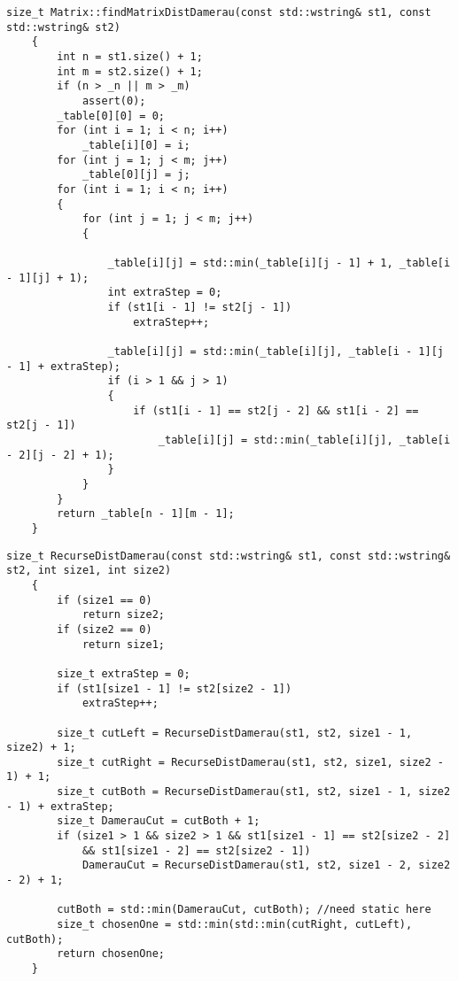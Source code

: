 \begin{lstlisting}[label=lst:damer_matr,caption=Метод нахождения расстояния Дамерау---Левенштейна с использованием матрицы]
    size_t Matrix::findMatrixDistDamerau(const std::wstring& st1, const std::wstring& st2)
    {
        int n = st1.size() + 1;
        int m = st2.size() + 1;
        if (n > _n || m > _m)
            assert(0);
        _table[0][0] = 0;
        for (int i = 1; i < n; i++)
            _table[i][0] = i;
        for (int j = 1; j < m; j++)
            _table[0][j] = j;
        for (int i = 1; i < n; i++)
        {
            for (int j = 1; j < m; j++)
            {
    
                _table[i][j] = std::min(_table[i][j - 1] + 1, _table[i - 1][j] + 1);
                int extraStep = 0;
                if (st1[i - 1] != st2[j - 1])
                    extraStep++;
    
                _table[i][j] = std::min(_table[i][j], _table[i - 1][j - 1] + extraStep);
                if (i > 1 && j > 1)
                {
                    if (st1[i - 1] == st2[j - 2] && st1[i - 2] == st2[j - 1])
                        _table[i][j] = std::min(_table[i][j], _table[i - 2][j - 2] + 1);
                }
            }
        }
        return _table[n - 1][m - 1];
    }
\end{lstlisting}

\begin{lstlisting}[label=lst:damer_rec,caption=Функция нахождения расстояния Дамерау---Левенштейна с использованием рекурсии]
    size_t RecurseDistDamerau(const std::wstring& st1, const std::wstring& st2, int size1, int size2)
    {
        if (size1 == 0)
            return size2;
        if (size2 == 0)
            return size1;
    
        size_t extraStep = 0;
        if (st1[size1 - 1] != st2[size2 - 1])
            extraStep++;
    
        size_t cutLeft = RecurseDistDamerau(st1, st2, size1 - 1, size2) + 1;
        size_t cutRight = RecurseDistDamerau(st1, st2, size1, size2 - 1) + 1;
        size_t cutBoth = RecurseDistDamerau(st1, st2, size1 - 1, size2 - 1) + extraStep;
        size_t DamerauCut = cutBoth + 1;
        if (size1 > 1 && size2 > 1 && st1[size1 - 1] == st2[size2 - 2]
            && st1[size1 - 2] == st2[size2 - 1])
            DamerauCut = RecurseDistDamerau(st1, st2, size1 - 2, size2 - 2) + 1;
    
        cutBoth = std::min(DamerauCut, cutBoth); //need static here
        size_t chosenOne = std::min(std::min(cutRight, cutLeft), cutBoth);
        return chosenOne;
    }
\end{lstlisting}

